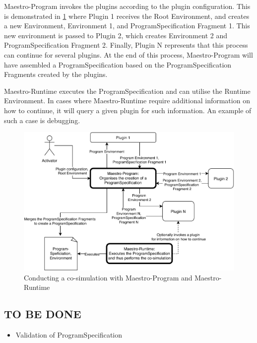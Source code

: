 Maestro-Program invokes the plugins according to the plugin configuration. This
is demonstrated in \cref{fig:conducting_co-simulation-overview} where Plugin 1
receives the Root Environment, and creates a new Environment, Environment 1, and
ProgramSpecification Fragment 1. This new environment is passed to Plugin 2,
which creates Environment 2 and ProgramSpecification Fragment 2. Finally, Plugin
N represents that this process can continue for several plugins.
At the end of this process, Maestro-Program will have assembled a
ProgramSpecification based on the ProgramSpecification Fragments created by the
plugins.

Maestro-Runtime executes the ProgramSpecification and can utilise the Runtime
Environment. In cases where Maestro-Runtime require
additional information on how to continue, it will query a
given plugin for such information. An example of such a case is debugging.


\begin{figure}[htb] \centering
  \includegraphics[width=\textwidth]{figures/conducting_co-simulation_overview.pdf}
  \caption{Conducting a co-simulation with Maestro-Program and Maestro-Runtime}
  \label{fig:conducting_co-simulation-overview}
\end{figure}

\subsection{TO BE DONE}
\begin{itemize}
  \item Validation of ProgramSpecification
  \end{itemize}

